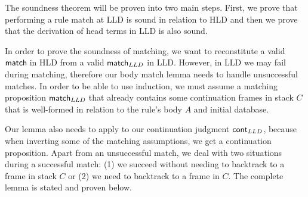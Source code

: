 The soundness theorem will be proven into two main steps. First, we prove that performing a rule match at LLD is sound in relation to HLD and
then we prove that the derivation of head terms in LLD is also sound.

In order to prove the soundness of matching, we want to reconstitute a valid $\mathsf{match} \;$in HLD from a valid $\mathsf{match}_{LLD} \;$in LLD. However, in LLD
we may fail during matching, therefore our body match lemma needs to handle unsuccessful matches. In order to be able to use induction, we
must assume a matching proposition $\mathsf{match}_{LLD} \;$that already contains some continuation frames in stack $C$ that is well-formed in relation to the rule's body $A$ and initial database.

Our lemma also
needs to apply to our continuation judgment $\mathsf{cont}_{LLD}$, because when inverting some of the matching assumptions, we get a continuation
proposition. Apart from an unsuccessful match, we deal with two situations during a successful match: (1) we succeed without needing to backtrack to a frame in stack $C$ or (2) we need to backtrack to a frame in $C$. The complete lemma is stated and proven below.

